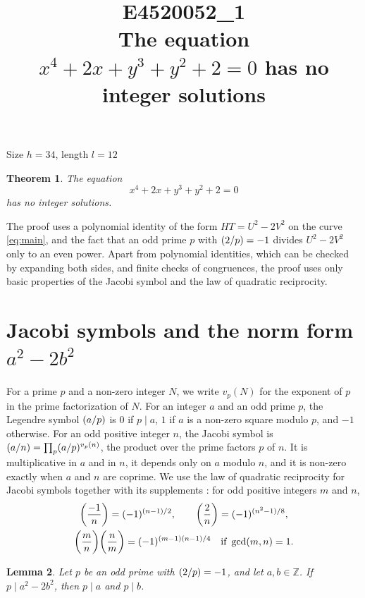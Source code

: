 \documentclass[11pt]{article}
\title{\textbf{E4520052\_1}\\[4pt] {\Large The equation $x^{4}+2x+y^{3}+y^{2}+2=0$ has no integer solutions}}
\author{}
\date{}
\newtheorem{theorem}{Theorem}
\newtheorem{lemma}[theorem]{Lemma}
\newcommand{\Z}{\mathbb{Z}}
\newcommand{\leg}[2]{\mathchoice{\biggl(\dfrac{#1}{#2}\biggr)}{(#1/#2)}{(#1/#2)}{(#1/#2)}}
\begin{document}
\maketitle
\vspace{-8ex}
\begin{center}
Size $h=34$, length $l=12$
\end{center}

\begin{theorem}\label{thm:main}
The equation
\begin{equation}\label{eq:main}
x^{4}+2x+y^{3}+y^{2}+2=0
\end{equation}
has no integer solutions.
\end{theorem}

The proof uses a polynomial identity of the form $HT=U^2-2V^2$ on the curve \eqref{eq:main}, and the fact that an odd prime $p$ with $\leg{2}{p}=-1$ divides $U^2-2V^2$ only to an even power. Apart from polynomial identities, which can be checked by expanding both sides, and finite checks of congruences, the proof uses only basic properties of the Jacobi symbol and the law of quadratic reciprocity.

\section{\texorpdfstring{Jacobi symbols and the norm form $a^2-2b^2$}{Jacobi symbols and the norm form}}

For a prime $p$ and a non-zero integer $N$, we write $v_p(N)$ for the exponent of $p$ in the prime factorization of $N$. For an integer $a$ and an odd prime $p$, the Legendre symbol $\leg{a}{p}$ is $0$ if $p\mid a$, $1$ if $a$ is a non-zero square modulo $p$, and $-1$ otherwise. For an odd positive integer $n$, the Jacobi symbol is $\leg{a}{n}=\prod_p\leg{a}{p}^{v_p(n)}$, the product over the prime factors $p$ of $n$. It is multiplicative in $a$ and in $n$, it depends only on $a$ modulo $n$, and it is non-zero exactly when $a$ and $n$ are coprime. We use the law of quadratic reciprocity for Jacobi symbols together with its supplements \cite[Chapter~5, \S2]{IR}: for odd positive integers $m$ and $n$,
\begin{gather*}
\leg{-1}{n}=(-1)^{(n-1)/2},\qquad\leg{2}{n}=(-1)^{(n^2-1)/8},\\
\leg{m}{n}\leg{n}{m}=(-1)^{(m-1)(n-1)/4}\quad\text{if }\gcd(m,n)=1.
\end{gather*}

\begin{lemma}\label{lem:divides}
Let $p$ be an odd prime with $\leg{2}{p}=-1$, and let $a,b\in\Z$. If $p\mid a^2-2b^2$, then $p\mid a$ and $p\mid b$.
\end{lemma}
\end{document}
